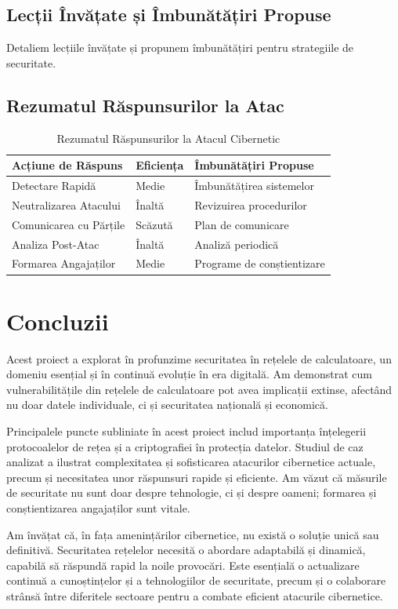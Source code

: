 \documentclass[12pt]{article}
\begin{document}
\subsection{Lecții Învățate și Îmbunătățiri Propuse}
Detaliem lecțiile învățate și propunem îmbunătățiri pentru strategiile de securitate.

\subsection{Rezumatul Răspunsurilor la Atac}
\begin{table}[h]
\centering
\begin{tabular}{@{}lll@{}}
\toprule
Acțiune de Răspuns & Eficiența & Îmbunătățiri Propuse \\ \midrule
Detectare Rapidă & Medie & Îmbunătățirea sistemelor \\
Neutralizarea Atacului & Înaltă & Revizuirea procedurilor \\
Comunicarea cu Părțile & Scăzută & Plan de comunicare \\
Analiza Post-Atac & Înaltă & Analiză periodică \\
Formarea Angajaților & Medie & Programe de conștientizare \\ \bottomrule
\end{tabular}
\caption{Rezumatul Răspunsurilor la Atacul Cibernetic}
\end{table}


\newpage
\section{Concluzii}
Acest proiect a explorat în profunzime securitatea în rețelele de calculatoare, un domeniu esențial și în continuă evoluție în era digitală. Am demonstrat cum vulnerabilitățile din rețelele de calculatoare pot avea implicații extinse, afectând nu doar datele individuale, ci și securitatea națională și economică.

Principalele puncte subliniate în acest proiect includ importanța înțelegerii protocoalelor de rețea și a criptografiei în protecția datelor. Studiul de caz analizat a ilustrat complexitatea și sofisticarea atacurilor cibernetice actuale, precum și necesitatea unor răspunsuri rapide și eficiente. Am văzut că măsurile de securitate nu sunt doar despre tehnologie, ci și despre oameni; formarea și conștientizarea angajaților sunt vitale.

Am învățat că, în fața amenințărilor cibernetice, nu există o soluție unică sau definitivă. Securitatea rețelelor necesită o abordare adaptabilă și dinamică, capabilă să răspundă rapid la noile provocări. Este esențială o actualizare continuă a cunoștințelor și a tehnologiilor de securitate, precum și o colaborare strânsă între diferitele sectoare pentru a combate eficient atacurile cibernetice.
\end{document}
